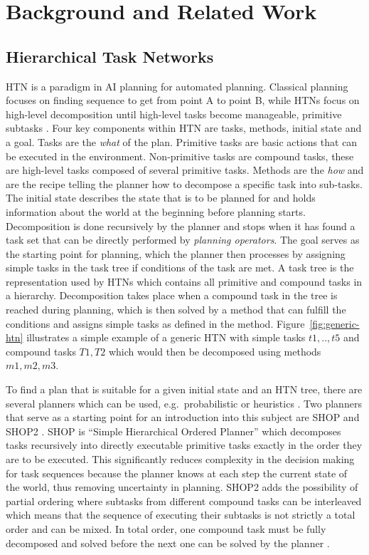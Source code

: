 \chapter{Background and Related Work}

\section{Hierarchical Task Networks}

HTN is a paradigm in AI planning for automated planning. Classical planning focuses on finding sequence to get from point A to point B, while HTNs focus on high-level decomposition until high-level tasks become manageable, primitive subtasks \parencite{nau_shop_1999}. Four key components within HTN are tasks, methods, initial state and a goal. Tasks are the \emph{what} of the plan. Primitive tasks are basic actions that can be executed in the environment. Non-primitive tasks are compound tasks, these are high-level tasks composed of several primitive tasks. Methods are the \emph{how} and are the recipe telling the planner how to decompose a specific task into sub-tasks. The initial state describes the state that is to be planned for and holds information about the world at the beginning before planning starts. Decomposition is done recursively by the planner and stops when it has found a task set that can be directly performed by \emph{planning operators}. The goal serves as the starting point for planning, which the planner then processes by assigning simple tasks in the task tree if conditions of the task are met. A task tree is the representation used by HTNs which contains all primitive and compound tasks in a hierarchy. Decomposition takes place when a compound task in the tree is reached during planning, which is then solved by a method that can fulfill the conditions and assigns simple tasks as defined in the method. Figure~\ref{fig:generic-htn} illustrates a simple example of a generic HTN with simple tasks $t1,.., t5$ and compound tasks $T1, T2$ which would then be decomposed using methods $m1, m2, m3$.



To find a plan that is suitable for a given initial state and an HTN tree, there are several planners which can be used, e.g.\ probabilistic \parencite{sherkat_two_2025} or heuristics \parencite{georgievski_htn_2015}. Two planners that serve as a starting point for an introduction into this subject are SHOP and SHOP2 \parencite{nau_shop_1999, nau_shop2_2003, nau_applications_2005}. SHOP is ``Simple Hierarchical Ordered Planner'' which decomposes tasks recursively into directly executable primitive tasks exactly in the order they are to be executed. This significantly reduces complexity in the decision making for task sequences because the planner knows at each step the current state of the world, thus removing uncertainty in planning. SHOP2 adds the possibility of partial ordering where subtasks from different compound tasks can be interleaved which means that the sequence of executing their subtasks is not strictly a total order and can be mixed. In total order, one compound task must be fully decomposed and solved before the next one can be solved by the planner \parencite{nau_shop2_2003}.

